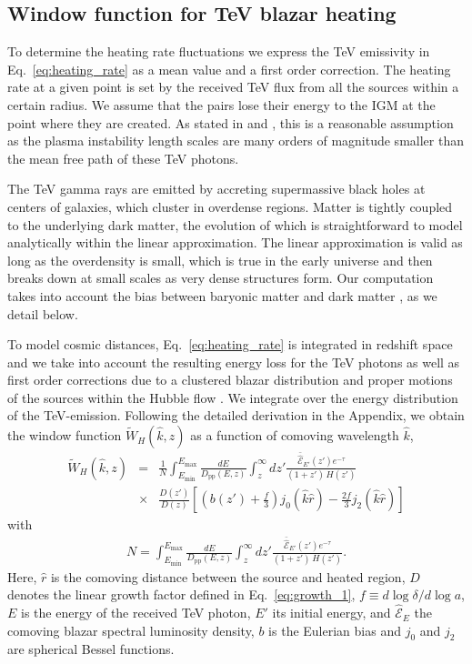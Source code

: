 \documentclass[numberedappendix]{emulateapj}
\begin{document}
\subsection{Window function for TeV blazar heating}\label{sec:window}
To determine the heating rate fluctuations we express the TeV emissivity in Eq.~\eqref{eq:heating_rate} as a mean value and a first order correction. The heating rate at a given point is set by the received TeV flux from all the sources within a certain radius. We assume that the pairs lose their energy to the IGM at the point where they are created. As stated in \citet{2012ApJ...752...22B} and \citet{2014ApJ...797..110C}, this is a reasonable assumption as the plasma instability length scales are many orders of magnitude smaller than the mean free path of these TeV photons.

The TeV gamma rays are emitted by accreting supermassive black holes at centers of galaxies, which cluster in overdense regions. Matter is tightly coupled to the underlying dark matter, the evolution of which is straightforward to model analytically within the linear approximation. The linear approximation is valid as long as the overdensity is small, which is true in the early universe and then breaks down at small scales as very dense structures form. Our computation takes into account the bias between baryonic matter and dark matter \citep{1996MNRAS.282..347M}, as we detail below.

To model cosmic distances, Eq.~\eqref{eq:heating_rate} is integrated in redshift space and we take into account the resulting energy loss for the TeV photons as well as first order corrections due to a clustered blazar distribution and proper motions of the sources within the Hubble flow \citep{1987MNRAS.227....1K}. We integrate over the energy distribution of the TeV-emission. Following the detailed derivation in the Appendix, we obtain the window function $\tilde{W}_H(\hat{k},z)$ as a function of comoving wavelength $\hat{k}$,
\begin{eqnarray}
\label{eq:window}
\tilde{W}_H(\hat{k},z)&=&\frac{1}{N}\int_{E_{\mathrm{min}}}^{E_{\mathrm{max}}}\frac{dE}{D_{\mathrm{pp}}(E,z)}
\int_z^{\infty}dz' \frac{\mathcal{\bar{\hat E}}_{E'}(z')e^{-\tau}}{(1+z')\,H(z')} \nonumber\\
&\times& \frac{D(z')}{D(z)}\left[\left(b(z')+\frac{f}{3}\right)j_0(\hat k \hat r)-\frac{2f}{3}j_2(\hat k \hat r)\right]
\end{eqnarray}
with
\begin{eqnarray}
\label{eq:define_N}
N=\int_{E_{\mathrm{min}}}^{E_{\mathrm{max}}} \frac{dE}{{D_{\mathrm{pp}}}(E,z)}
\int_z^{\infty} dz'   \frac{\mathcal{\bar{\hat E}}_{E'}(z') e^{-\tau}}{(1+z')\,H(z')}.
\end{eqnarray}
Here, $\hat{r}$ is the comoving distance between the source and heated
region, $D$ denotes the linear growth factor defined in
Eq.~\eqref{eq:growth_1}, $f\equiv d\log \delta/d \log a$, $E$ is the
energy of the received TeV photon, $E'$ its initial energy, and
$\hat{\mathcal{E}}_E$ the comoving blazar spectral luminosity density, $b$
is the Eulerian bias and $j_0$ and $j_2$ are spherical Bessel
functions.
\end{document}
